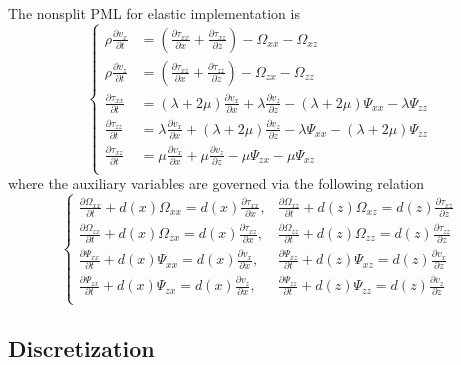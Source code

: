The nonsplit PML for  elastic implementation is
\begin{equation}\label{eq:npml1}
\left\{
\begin{split}
	\rho\frac{\partial v_x}{\partial t} &= (\frac{\partial \tau_{xx}}{\partial x}+\frac{\partial \tau_{xz}}{\partial z})-\Omega_{xx}-\Omega_{xz}\\
	\rho\frac{\partial v_z}{\partial t} &= (\frac{\partial \tau_{xz}}{\partial x}+\frac{\partial \tau_{zz}}{\partial z})-\Omega_{zx}-\Omega_{zz}\\	
	\frac{\partial \tau_{xx}}{\partial t} &=(\lambda+2\mu)\frac{\partial v_x}{\partial x}+\lambda\frac{\partial v_z}{\partial z}-(\lambda+2\mu)\Psi_{xx}-\lambda\Psi_{zz}\\
	\frac{\partial \tau_{zz}}{\partial t} &=\lambda\frac{\partial v_x}{\partial x}+(\lambda+2\mu)\frac{\partial v_z}{\partial z}-\lambda\Psi_{xx}-(\lambda+2\mu)\Psi_{zz}\\
	\frac{\partial \tau_{xz}}{\partial t}&=\mu\frac{\partial v_x}{\partial x}+\mu\frac{\partial v_z}{\partial z}-\mu\Psi_{zx}-\mu\Psi_{xz}\\
\end{split}\right.
\end{equation}
where the auxiliary variables are governed via the following relation
\begin{equation}\label{eq:npml2}
\left\{
\begin{split}
	\frac{\partial \Omega_{xx}}{\partial t}+d(x)\Omega_{xx}=d(x)\frac{\partial \tau_{xx}}{\partial x},
	&\frac{\partial \Omega_{xz}}{\partial t}+d(z)\Omega_{xz}=d(z)\frac{\partial \tau_{xz}}{\partial z}\\
	\frac{\partial \Omega_{zx}}{\partial t}+d(x)\Omega_{zx}=d(x)\frac{\partial \tau_{xz}}{\partial x},
	&\frac{\partial \Omega_{zz}}{\partial t}+d(z)\Omega_{zz}=d(z)\frac{\partial \tau_{zz}}{\partial z}\\
	\frac{\partial \Psi_{xx}}{\partial t}+d(x)\Psi_{xx}=d(x)\frac{\partial v_x}{\partial x},
	&\frac{\partial \Psi_{xz}}{\partial t}+d(z)\Psi_{xz}=d(z)\frac{\partial v_x}{\partial z}\\
	\frac{\partial \Psi_{zx}}{\partial t}+d(x)\Psi_{zx}=d(x)\frac{\partial v_z}{\partial x},
	&\frac{\partial \Psi_{zz}}{\partial t}+d(z)\Psi_{zz}=d(z)\frac{\partial v_z}{\partial z}\\
\end{split}\right.
\end{equation}

\subsection{Discretization}

